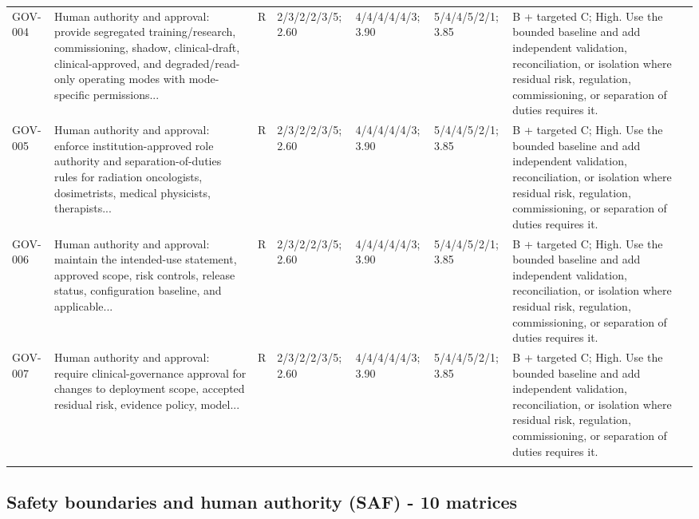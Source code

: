\documentclass[11pt,letterpaper]{article}
\begin{document}
\begin{scriptsize}
\begin{longtable}{@{}L{0.11\textwidth}L{0.165\textwidth}L{0.04\textwidth}L{0.115\textwidth}L{0.115\textwidth}L{0.115\textwidth}L{0.235\textwidth}@{}}
\addlinespace[2pt]
GOV-004 & Human authority and approval: provide segregated training\slash\allowbreak{}research, commissioning, shadow, clinical-draft, clinical-approved, and degraded\slash\allowbreak{}read-only operating modes with mode-specific permissions... & R & 2/3/2/2/3/5; 2.60 & 4/4/4/4/4/3; 3.90 & 5/4/4/5/2/1; 3.85 & B + targeted C; High. Use the bounded baseline and add independent validation, reconciliation, or isolation where residual risk, regulation, commissioning, or separation of duties requires it. \\
\addlinespace[2pt]
GOV-005 & Human authority and approval: enforce institution-approved role authority and separation-of-duties rules for radiation oncologists, dosimetrists, medical physicists, therapists... & R & 2/3/2/2/3/5; 2.60 & 4/4/4/4/4/3; 3.90 & 5/4/4/5/2/1; 3.85 & B + targeted C; High. Use the bounded baseline and add independent validation, reconciliation, or isolation where residual risk, regulation, commissioning, or separation of duties requires it. \\
\addlinespace[2pt]
GOV-006 & Human authority and approval: maintain the intended-use statement, approved scope, risk controls, release status, configuration baseline, and applicable... & R & 2/3/2/2/3/5; 2.60 & 4/4/4/4/4/3; 3.90 & 5/4/4/5/2/1; 3.85 & B + targeted C; High. Use the bounded baseline and add independent validation, reconciliation, or isolation where residual risk, regulation, commissioning, or separation of duties requires it. \\
\addlinespace[2pt]
GOV-007 & Human authority and approval: require clinical-governance approval for changes to deployment scope, accepted residual risk, evidence policy, model... & R & 2/3/2/2/3/5; 2.60 & 4/4/4/4/4/3; 3.90 & 5/4/4/5/2/1; 3.85 & B + targeted C; High. Use the bounded baseline and add independent validation, reconciliation, or isolation where residual risk, regulation, commissioning, or separation of duties requires it. \\
\addlinespace[2pt]
\end{longtable}
\end{scriptsize}

\subsection{Safety boundaries and human authority (SAF) - 10 matrices}
\end{document}
